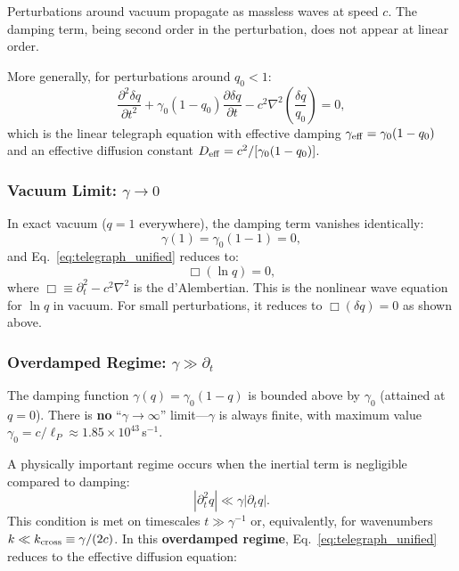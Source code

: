 \documentclass[aps,prd,twocolumn,showpacs,superscriptaddress,preprintnumbers]{revtex4-2}
\begin{document}
Perturbations around vacuum propagate as massless waves at speed $c$.
The damping term, being second order in the perturbation, does not appear at linear order.

More generally, for perturbations around $q_0<1$:
\begin{equation}
\frac{\partial^2 \delta q}{\partial t^2} + \gamma_0(1-q_0)\frac{\partial \delta q}{\partial t} - c^2\nabla^2\left(\frac{\delta q}{q_0}\right) = 0,
\label{eq:linear_telegraph_general}
\end{equation}
which is the linear telegraph equation with effective damping $\gamma_{\rm eff}=\gamma_0(1-q_0)$ and an effective diffusion constant $D_{\rm eff}=c^2/[\gamma_0(1-q_0)]$.

\subsubsection{Vacuum Limit: $\gamma\to0$}

In exact vacuum ($q=1$ everywhere), the damping term vanishes identically:
\begin{equation}
\gamma(1) = \gamma_0(1-1) = 0,
\end{equation}
and Eq.~\eqref{eq:telegraph_unified} reduces to:
\begin{equation}
\boxed{\Box(\ln q) = 0},
\label{eq:box_lnq}
\end{equation}
where $\Box\equiv\partial_t^2-c^2\nabla^2$ is the d'Alembertian.
This is the nonlinear wave equation for $\ln q$ in vacuum.
For small perturbations, it reduces to $\Box(\delta q)=0$ as shown above.

\subsubsection{Overdamped Regime: $\gamma\gg\partial_t$}

The damping function $\gamma(q)=\gamma_0(1-q)$ is bounded above by $\gamma_0$ (attained at $q=0$).
There is \textbf{no} ``$\gamma\to\infty$'' limit---$\gamma$ is always finite, with maximum value $\gamma_0=c/\ell_P\approx1.85\times10^{43}$\,s$^{-1}$.

A physically important regime occurs when the inertial term is negligible compared to damping:
\begin{equation}
|\partial_t^2 q| \ll \gamma|\partial_t q|.
\end{equation}
This condition is met on timescales $t\gg\gamma^{-1}$ or, equivalently, for wavenumbers $k\ll k_{\rm cross}\equiv\gamma/(2c)$.
In this \textbf{overdamped regime}, Eq.~\eqref{eq:telegraph_unified} reduces to the effective diffusion equation:
\end{document}
